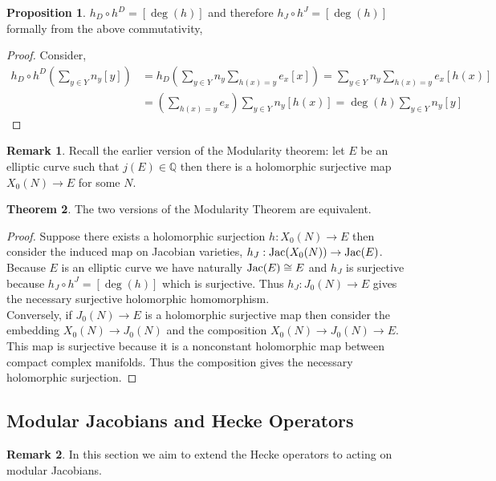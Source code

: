 \documentclass{article}
\newcommand{\Q}{\mathbb{Q}}
\theoremstyle{definition}
\newtheorem{theorem}{Theorem}[section]
\newtheorem{proposition}[theorem]{Proposition}
\newtheorem{remark}{Remark}[section]
\begin{document}
\begin{proposition}
$h_D \circ h^D = [\deg{(h)}]$ and therefore $h_J \circ h^J = [\deg{(h)}]$ formally from the above commutativity,
\end{proposition}

\begin{proof}
Consider,
\begin{align*}
h_D \circ h^D \left( \sum_{y \in Y} n_y [y] \right) & = h_D \left( \sum_{y \in Y} n_y \sum_{h(x) = y} e_x [x] \right) = \sum_{y \in Y} n_y \sum_{h(x) = y} e_x [h(x)]
\\
& = \left( \sum_{h(x) = y} e_x \right) \sum_{y \in Y} n_y [h(x)] = \deg{(h)} \sum_{y \in Y} n_y [y]
\end{align*}
\end{proof}

\begin{remark}
Recall the earlier version of the Modularity theorem: let $E$ be an elliptic curve such that $j(E) \in \Q$ then there is a holomorphic surjective map $X_0(N) \to E$ for some $N$.
\end{remark}

\begin{theorem}
The two versions of the Modularity Theorem are equivalent.
\end{theorem}

\begin{proof}
Suppose there exists a holomorphic surjection $h : X_0(N) \to E$ then consider the induced map on Jacobian varieties, $h_J : \mathrm{Jac}(X_0(N)) \to \mathrm{Jac}(E)$. Because $E$ is an elliptic curve we have naturally $\mathrm{Jac}(E) \cong E$ and $h_J$ is surjective because $h_J \circ h^J = [\deg{(h)}]$ which is surjective. Thus $h_J : J_0(N) \to E$ gives the necessary surjective holomorphic homomorphism.
\bigskip\\
Conversely, if $J_0(N) \to E$ is a holomorphic surjective map then consider the embedding $X_0(N) \to J_0(N)$ and the composition $X_0(N) \to J_0(N) \to E$. This map is surjective because it is a nonconstant holomorphic map between compact complex manifolds. Thus the composition gives the necessary holomorphic surjection.
\end{proof}

\subsection{Modular Jacobians and Hecke Operators}

\begin{remark}
In this section we aim to extend the Hecke operators to acting on modular Jacobians. 
\end{remark}
\end{document}
